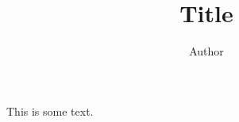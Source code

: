 \documentclass{beamer}
\title{Title}
\author{Author}
\institute{Institute}
\begin{document}
This is some text.
\end{document}
